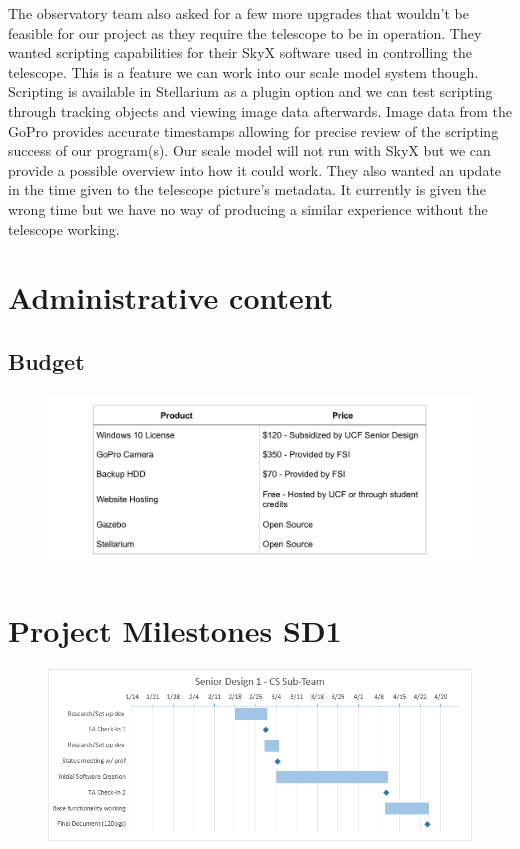 \documentclass[12pt]{report}
\begin{document}
\begin{enumerate}
The observatory team also asked for a few more upgrades that wouldn’t be feasible for our project as they require the telescope to be in operation. They wanted scripting capabilities for their SkyX software used in controlling the telescope. This is a feature we can work into our scale model system though. Scripting is available in Stellarium as a plugin option and we can test scripting through tracking objects and viewing image data afterwards. Image data from the GoPro provides accurate timestamps allowing for precise review of the scripting success of our program(s). Our scale model will not run with SkyX but we can provide a possible overview into how it could work. They also wanted an update in the time given to the telescope picture’s metadata. It currently is given the wrong time but we have no way of producing a similar experience without the telescope working.

\clearpage

\section{Administrative content}

\subsection*{Budget}

\begin{figure}[h]
	\centering
	\includegraphics[width=\linewidth]{budgettable}
\end{figure}

\section*{Project Milestones SD1}

\begin{figure}[h]
	\centering
	\includegraphics[width=\linewidth]{SD1Gantt}
\end{figure}


\end{enumerate}
\end{document}
